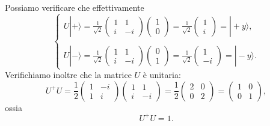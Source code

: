 \documentclass[a4paper,12pt,oneside]{book}
\begin{document}
Possiamo verificare che effettivamente
	\begin{equation}
		\begin{cases}
		U | + \rangle = \frac{1}{\sqrt{2}}
		\begin{pmatrix}
		1 & 1 \\
		i & -i
		\end{pmatrix}
		\begin{pmatrix}
		1\\
		0
		\end{pmatrix}=
		\frac{1}{\sqrt{2}}
		\begin{pmatrix}
		1\\
		i
		\end{pmatrix}=
		| +y \rangle , \\
		\\
		U | - \rangle= \frac{1}{\sqrt{2}}
		\begin{pmatrix}
		1 & 1 \\
		i & -i
		\end{pmatrix}
		\begin{pmatrix}
		0\\
		1
		\end{pmatrix}=
		\frac{1}{\sqrt{2}}
		\begin{pmatrix}
		1\\
		-i
		\end{pmatrix}=
		| -y \rangle . 
		\end{cases}
	\end{equation}
Verifichiamo inoltre che la matrice $U$ è unitaria:
	\begin{equation}
		U^+U = \frac{1}{2}
		\begin{pmatrix}
		1 & -i\\
		1 & i
		\end{pmatrix}
		\begin{pmatrix}
		1 & 1\\
		i & -i
		\end{pmatrix}=
		\frac{1}{2}
		\begin{pmatrix}
		2 & 0\\
		0 & 2
		\end{pmatrix}=
		\begin{pmatrix}
		1 & 0\\
		0 &1
		\end{pmatrix} , 
	\end{equation}
ossia
	\begin{equation}
		\boxed{
			U^+U=1 .
			} 
	\end{equation}
\end{document}
